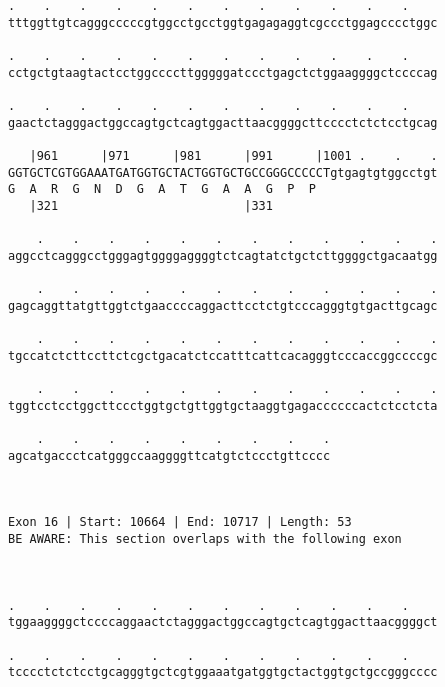 \documentclass{article}
\begin{document}
\begin{Verbatim}
.    .    .    .    .    .    .    .    .    .    .    .    
tttggttgtcagggcccccgtggcctgcctggtgagagaggtcgccctggagcccctggc
                                                            
.    .    .    .    .    .    .    .    .    .    .    .    
cctgctgtaagtactcctggccccttgggggatccctgagctctggaaggggctccccag
                                                            
.    .    .    .    .    .    .    .    .    .    .    .    
gaactctagggactggccagtgctcagtggacttaacggggcttcccctctctcctgcag
                                                            
   |961      |971      |981      |991      |1001 .    .    .
GGTGCTCGTGGAAATGATGGTGCTACTGGTGCTGCCGGGCCCCCTgtgagtgtggcctgt
G  A  R  G  N  D  G  A  T  G  A  A  G  P  P                 
   |321                          |331                       
  
    .    .    .    .    .    .    .    .    .    .    .    .
aggcctcagggcctgggagtggggaggggtctcagtatctgctcttggggctgacaatgg
                                                            
    .    .    .    .    .    .    .    .    .    .    .    .
gagcaggttatgttggtctgaaccccaggacttcctctgtcccagggtgtgacttgcagc
                                                            
    .    .    .    .    .    .    .    .    .    .    .    .
tgccatctcttccttctcgctgacatctccatttcattcacagggtcccaccggccccgc
                                                            
    .    .    .    .    .    .    .    .    .    .    .    .
tggtcctcctggcttccctggtgctgttggtgctaaggtgagaccccccactctcctcta
                                                            
    .    .    .    .    .    .    .    .    .
agcatgaccctcatgggccaaggggttcatgtctccctgttcccc
                                             
                                             
 
Exon 16 | Start: 10664 | End: 10717 | Length: 53
BE AWARE: This section overlaps with the following exon



.    .    .    .    .    .    .    .    .    .    .    .    
tggaaggggctccccaggaactctagggactggccagtgctcagtggacttaacggggct
                                                            
.    .    .    .    .    .    .    .    .    .    .    .    
tcccctctctcctgcagggtgctcgtggaaatgatggtgctactggtgctgccgggcccc
                                                            

\end{Verbatim}
\end{document}
